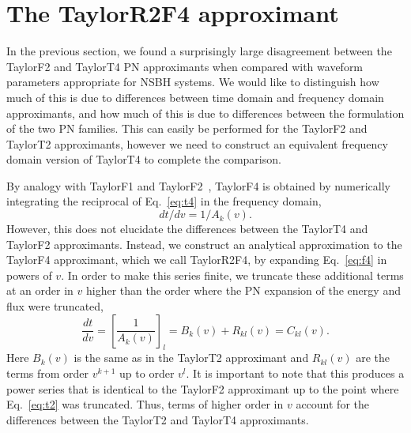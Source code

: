 



\section{The TaylorR2F4 approximant}
\label{sec:R2F4}

In the previous section, we found a surprisingly large disagreement between the TaylorF2 and TaylorT4
\ac{PN} approximants when compared with waveform parameters appropriate for
\ac{NSBH} systems. We would like to distinguish how much of this is due to
differences between time domain and frequency domain approximants, and how much
of this is due to differences between the formulation of the two \ac{PN}
families.  This can easily be performed for the TaylorF2 and TaylorT2
approximants, however we need to construct an equivalent frequency domain
version of TaylorT4 to complete the comparison.

By analogy with TaylorF1 and TaylorF2~\cite{Damour:2000zb,Buonanno:2009zt},
TaylorF4 is obtained by numerically integrating the reciprocal of Eq.~\eqref{eq:t4}
in the frequency domain,
%
\begin{equation}\label{eq:f4}
%
dt/dv = 1 / A_k(v).
%
\end{equation}
%
However, this does not elucidate the differences between the TaylorT4 and
TaylorF2 approximants. Instead, we construct an analytical approximation to the
TaylorF4 approximant, which we call TaylorR2F4, by expanding Eq.~\eqref{eq:f4} in
powers of $v$. In order to make this series finite, we truncate these
additional terms at an order in $v$ higher than the order where the \ac{PN}
expansion of the energy and flux were truncated,
%
\begin{equation}
%
\frac{dt}{dv} = \left[ \frac{1}{A_{k}(v)} \right]_l = B_{k}(v) + R_{kl}(v) =
C_{kl}(v).
%
\end{equation}
%
Here $B_{k}(v)$ is the same as in the TaylorT2 approximant and $R_{kl}(v)$ are
the terms from order $v^{k+1}$ up to order $v^l$. It is important to note that
this produces a power series that is identical to the TaylorF2 approximant up
to the point where Eq.~\eqref{eq:t2} was truncated.  Thus, terms of higher order in
$v$ account for the differences between the TaylorT2 and TaylorT4 approximants.

